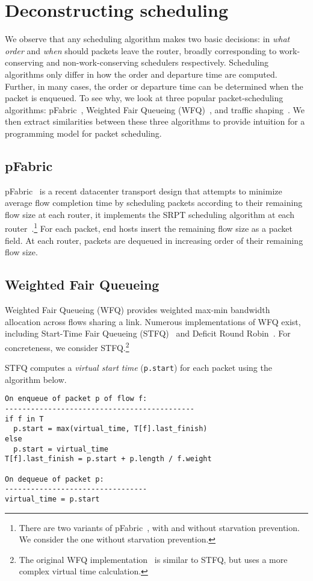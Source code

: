 \section{Deconstructing scheduling}
\label{s:deconstruct}
We observe that any scheduling algorithm makes two basic decisions: in  {\em
what order} and {\em when} should packets leave the router, broadly corresponding
to work-conserving and non-work-conserving schedulers respectively.  Scheduling
algorithms only differ in how the order and departure time are computed.
Further, in many cases, the order or departure time can be determined when the
packet is enqueued.  To see why, we look at three popular packet-scheduling
algorithms: pFabric~\cite{pFabric}, Weighted Fair Queueing (WFQ)~\cite{wfq}, and
traffic shaping~\cite{tbf}. We then extract similarities between these three
algorithms to provide intuition for a programming model for packet scheduling.

\subsection{pFabric}
pFabric~\cite{pFabric} is a recent datacenter transport design that attempts to
minimize average flow completion time by scheduling packets according to their
remaining flow size at each router, \ie it implements the SRPT scheduling
algorithm at each router~\cite{srpt}.\footnote{There are two variants of
pFabric~\cite{pFabric}, with and without starvation prevention.  We consider
the one without starvation prevention.} For each packet, end hosts insert the
remaining flow size as a packet field. At each router, packets are dequeued in
increasing order of their remaining flow size.

\subsection{Weighted Fair Queueing}
\label{ss:decon_wfq}
Weighted Fair Queueing (WFQ) provides weighted max-min bandwidth allocation
across flows sharing a link. Numerous implementations of WFQ exist, including
Start-Time Fair Queueing (STFQ)~\cite{stfq} and Deficit Round Robin~\cite{drr}.
For concreteness, we consider STFQ.\footnote{The original WFQ
implementation~\cite{wfq} is similar to STFQ, but uses a more complex virtual
time calculation.}

STFQ computes a {\em virtual start time} ({\tt p.start}) for each packet using
the algorithm below. 
\begin{lstlisting}[style=customc]
On enqueue of packet p of flow f:
--------------------------------------------
if f in T
  p.start = max(virtual_time, T[f].last_finish)
else
  p.start = virtual_time
T[f].last_finish = p.start + p.length / f.weight

On dequeue of packet p:
---------------------------------
virtual_time = p.start
\end{lstlisting}

